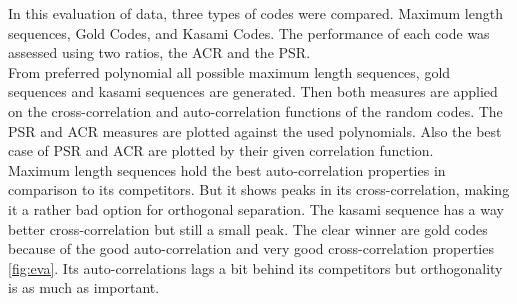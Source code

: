 %
%
%
%
%
In this evaluation of data, three types of codes were compared. Maximum length sequences, Gold Codes, and Kasami Codes. The performance of each code was assessed using two ratios, the ACR and the PSR.\\
From preferred polynomial all possible maximum length sequences, gold sequences and kasami sequences are generated. Then both measures are applied on the cross-correlation and auto-correlation functions of the random codes. The PSR and ACR measures are plotted against the used polynomials. Also the best case of PSR and ACR are plotted by their given correlation function.\\
Maximum length sequences hold the best auto-correlation properties in comparison to its competitors. But it shows peaks in its cross-correlation, making it a rather bad option for orthogonal separation. The kasami sequence has a way better cross-correlation but still a small peak. The clear winner are gold codes because of the good auto-correlation and very good cross-correlation properties \ref{fig:eva}. Its auto-correlations lags a bit behind its competitors but orthogonality is as much as important. 
%
%	
%
%	

